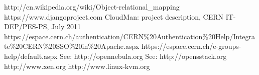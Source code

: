 %
%
http://en.wikipedia.org/wiki/Object-relational\_mapping
https://www.djangoproject.com
CloudMan: project description, CERN IT-DEP/PES-PS, July 2011
https://espace.cern.ch/authentication/CERN\%20Authentication\%20Help/Integrate\%20CERN\%20SSO\%20in\%20Apache.aspx
https://espace.cern.ch/e-groups-help/default.aspx
See: http://opennebula.org
See: http://opensstack.org
http://www.xen.org
http://www.linux-kvm.org

